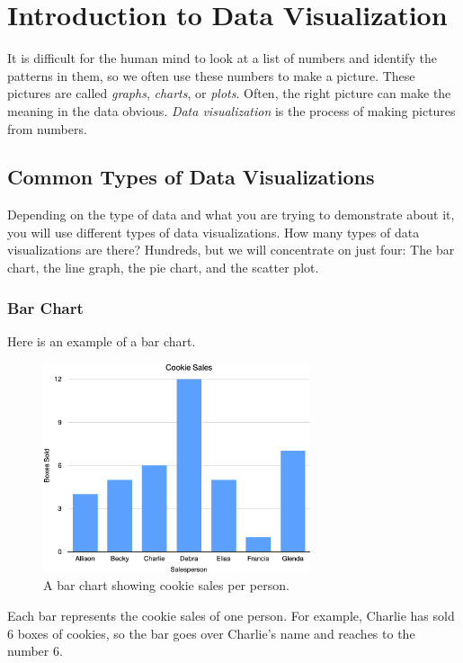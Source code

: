 \chapter{Introduction to Data Visualization}

It is difficult for the human mind to look at a list of numbers and
identify the patterns in them, so we often use these numbers to make a picture. These pictures are called \textit{graphs},
\textit{charts}, or \textit{plots}. Often, the right picture can make
the meaning in the data obvious. \textit{Data visualization} is the
process of making pictures from numbers.

\section{Common Types of Data Visualizations}

Depending on the type of data and what you are trying to demonstrate
about it, you will use different types of data visualizations.  How
many types of data visualizations are there? Hundreds, but we will
concentrate on just four: The bar chart, the line graph, the pie
chart, and the scatter plot.

\subsection{Bar Chart}

Here is an example of a bar chart.

\begin{figure}[htbp]
    \centering
    \includegraphics[width=0.7\textwidth]{CookieChart.png}
    \caption{A bar chart showing cookie sales per person.}
    \label{fig:bar}
\end{figure}

Each bar represents the cookie sales of one person. For example,
Charlie has sold 6 boxes of cookies, so the bar goes over Charlie's
name and reaches to the number 6.

